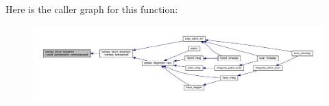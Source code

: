 Here is the caller graph for this function\+:\nopagebreak
\begin{figure}[H]
\begin{center}
\leavevmode
\includegraphics[width=350pt]{namespacecanopy__struct__dynamics_ac0b8111bae6ded12c5757262b058d989_icgraph}
\end{center}
\end{figure}


